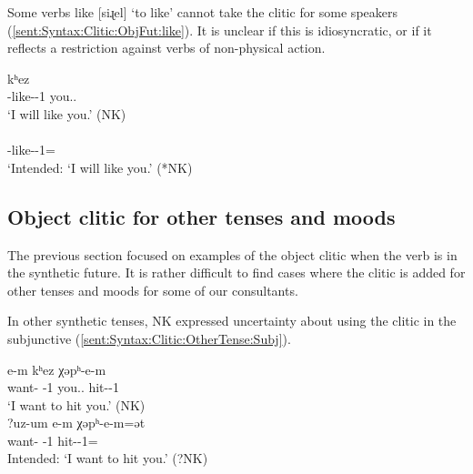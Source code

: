 Some verbs like [{siɻel}]  `to like’ cannot take the clitic for some speakers (\ref{sent:Syntax:Clitic:ObjFut:like}). It is unclear if this is idiosyncratic, or if it reflects a restriction against verbs of non-physical action.

\begin{exe}
	\ex \label{sent:Syntax:Clitic:ObjFut:like}
	\begin{xlist}
		\ex {}  {kʰez }
		\\
		{\fut}-like-{\thgloss}-1{\sg} you.{\sg}.{\dat}
		\\
		\trans	`I {will} like you.' \hfill   (NK)
		\\
		\ex {}
		\\
		{\fut}-like-{\thgloss}-1{\sg}={\possSsg}
		\\
		\trans	`Intended:  `I {will} like you.' \hfill  (*NK)
		\\
	\end{xlist}
\end{exe}

\subsection{Object clitic for other tenses and moods}\label{section:syntax:clitic:other tense}
The previous section focused on   examples of the object clitic when the verb is in the synthetic future. It is rather difficult to find cases where the clitic is added for other tenses and moods for some of our consultants.


In other synthetic tenses, NK expressed uncertainty about using the clitic in the subjunctive (\ref{sent:Syntax:Clitic:OtherTense:Subj}). 

\begin{exe}
	\ex \label{sent:Syntax:Clitic:OtherTense:Subj}
	\begin{xlist}
		\ex {}  {e-m}   {kʰez} {χəpʰ-e-m }  
		\\
		want-{\impfcvb} {\auxgloss}-1{\sg} you.{\sg}.{\dat} hit-{\thgloss}-1{\sg} 
		\\
		\trans	`I want to hit you.' \hfill (NK)
		\\
		\armenian{Ուզում եմ քեզ խփեմ։}
		\ex \gll ?{uz-um}  {e-m} {χəpʰ-e-m=ət} 
		\\
		want-{\impfcvb} {\auxgloss}-1{\sg} hit-{\thgloss}-1{\sg}={\possSsg}
		\\
		\trans		Intended:  `I want to hit you.’ \hfill (?NK)
	\end{xlist}
	
\end{exe}

